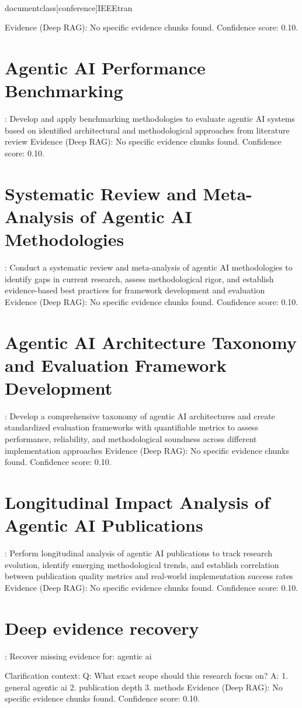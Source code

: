 \\documentclass[conference]{IEEEtran}
\begin{document}
Evidence (Deep RAG):
No specific evidence chunks found.
Confidence score: 0.10.\n\n\section{Agentic AI Performance Benchmarking}\nObjective: Develop and apply benchmarking methodologies to evaluate agentic AI systems based on identified architectural and methodological approaches from literature review
Evidence (Deep RAG):
No specific evidence chunks found.
Confidence score: 0.10.\n\n\section{Systematic Review and Meta-Analysis of Agentic AI Methodologies}\nObjective: Conduct a systematic review and meta-analysis of agentic AI methodologies to identify gaps in current research, assess methodological rigor, and establish evidence-based best practices for framework development and evaluation
Evidence (Deep RAG):
No specific evidence chunks found.
Confidence score: 0.10.\n\n\section{Agentic AI Architecture Taxonomy and Evaluation Framework Development}\nObjective: Develop a comprehensive taxonomy of agentic AI architectures and create standardized evaluation frameworks with quantifiable metrics to assess performance, reliability, and methodological soundness across different implementation approaches
Evidence (Deep RAG):
No specific evidence chunks found.
Confidence score: 0.10.\n\n\section{Longitudinal Impact Analysis of Agentic AI Publications}\nObjective: Perform longitudinal analysis of agentic AI publications to track research evolution, identify emerging methodological trends, and establish correlation between publication quality metrics and real-world implementation success rates
Evidence (Deep RAG):
No specific evidence chunks found.
Confidence score: 0.10.\n\n\section{Deep evidence recovery}\nObjective: Recover missing evidence for: agentic ai

Clarification context:
Q: What exact scope should this research focus on?
A: 1. general agentic ai 
2. publication depth
3. methods
Evidence (Deep RAG):
No specific evidence chunks found.
Confidence score: 0.10.

\
\

\
\end{document}

